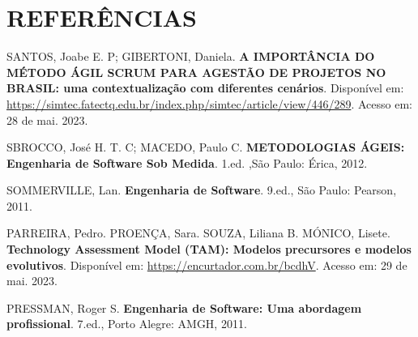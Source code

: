 \chapter{REFERÊNCIAS}

SANTOS, Joabe E. P; GIBERTONI, Daniela. \textbf{A IMPORTÂNCIA DO MÉTODO ÁGIL SCRUM PARA AGESTÃO DE PROJETOS NO BRASIL: uma contextualização com diferentes cenários}. Disponível em: \url{https://simtec.fatectq.edu.br/index.php/simtec/article/view/446/289}. Acesso em: 28 de mai. 2023.

SBROCCO, José H. T. C; MACEDO, Paulo C. \textbf{METODOLOGIAS ÁGEIS: Engenharia de Software Sob Medida}. 1.ed. ,São Paulo: Érica, 2012.

SOMMERVILLE, Lan. \textbf{Engenharia de Software}. 9.ed., São Paulo: Pearson, 2011.

PARREIRA, Pedro. PROENÇA, Sara. SOUZA, Liliana B. MÓNICO, Lisete. \textbf{Technology Assessment Model (TAM): Modelos precursores e modelos evolutivos}. Disponível em: \url{https://encurtador.com.br/bcdhV}. Acesso em: 29 de mai. 2023.

PRESSMAN, Roger S. \textbf{Engenharia de Software: Uma abordagem profissional}. 7.ed., Porto Alegre: AMGH, 2011.
